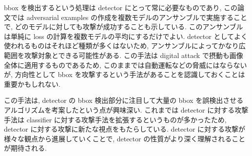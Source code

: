 bbox を検出するという処理は detector にとって常に必要なものであり, この論文では adversarial examples の作成を複数モデルのアンサンブルで実施することで, どのモデルに対しても攻撃が成功することも示している.
このアンサンブルは単純に loss の計算を複数モデルの平均にするだけでよい.
detector としてよく使われるものはそれほど種類が多くはないため, アンサンブルによってかなり広範囲を攻撃対象とできる可能性がある.
この手法は digital attack で摂動も画像全体に適用するものであるため, このままでは自動運転などの脅威にはならないが, 方向性として bbox を攻撃するという手法があることを認識しておくことは重要かもしれない.

この手法は, detector の bbox 検出部分に注目して大量の bbox を誤検出させるアルゴリズムを考案したという点が興味深い.
これまでは detector に対する攻撃手法は classifier に対する攻撃手法を拡張するというものが多かったため, detector に対する攻撃に新たな視点をもたらしている.
detector に対する攻撃が様々な観点から進展していくことで, detector の性質がより深く理解されることが期待される.
